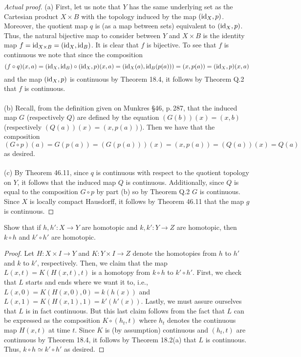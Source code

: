 \begin{proof}[Actual proof]
(a) First, let us note that $Y$ has the same underlying set as
the Cartesian product $X\times B$ with the topology induced by
the map $(\operatorname{id}_X,p)$. Moreover, the quotient map $q$ is (as a map
between sets) equivalent to $(\operatorname{id}_X,p)$. Thus, the natural
bijective map to consider between $Y$ and $X\times B$ is the
identity map $f=\operatorname{id}_{X\times B}=(\operatorname{id}_X,\operatorname{id}_B)$. It is clear that
$f$ is bijective. To see that $f$ is continuous we note that
since the composition
\[
(f\circ q)(x,a)
=(\operatorname{id}_X,\operatorname{id}_B)\circ(\operatorname{id}_X,p)(x,a)
=(\operatorname{id}_X(a),\operatorname{id}_B(p(a)))
=(x,p(a))
=(\operatorname{id}_X,p)(x,a)
\]
and the map $(\operatorname{id}_X,p)$ is continuous by Theorem 18.4, it
follows by Theorem Q.2 that $f$ is continuous.
\\\\
(b) Recall, from the definition given on Munkres \S46, p.\,287,
that the induced map $G$ (respectively $Q$) are defined by the
equation $(G(b))(x)=(x,b)$ (respectively
$(Q(a))(x)=(x,p(a))$). Then we have that the composition
\[
(G\circ p)(a)=G(p(a))=(G(p(a)))(x)=(x,p(a))=(Q(a))(x)=Q(a)
\]
as desired.
\\\\
(c) By Theorem 46.11, since $q$ is continuous with respect to the
quotient topology on $Y$, it follows that the induced map $Q$ is
continuous. Additionally, since $Q$ is equal to the composition
$G\circ p$ by part (b) so by Theorem Q.2 $G$ is continuous. Since
$X$ is locally compact Hausdorff, it follows by Theorem 46.11
that the map $g$ is continuous.
\end{proof}
\newpage
\begin{problem}[Munkres \S51, Ex.\,1]
Show that if $h,h'\colon X\to Y$ are homotopic and $k,k'\colon
Y\to Z$ are homotopic, then $k\circ h$ and $k'\circ h'$ are
homotopic.
\end{problem}
\begin{proof}
Let $H\colon X\times I\to Y$ and $K\colon Y\times I\to Z$ denote
the homotopies from $h$ to $h'$ and $k$ to $k'$,
respectively. Then, we claim that the map $L(x,t)=K(H(x,t),t)$ is
a homotopy from $k\circ h$ to $k'\circ h'$. First, we check that
$L$ starts and ends where we want it to, i.e.,
$L(x,0)=K(H(x,0),0)=k(h(x))$ and
$L(x,1)=K(H(x,1),1)=k'(h'(x))$. Lastly, we must assure ourselves
that $L$ is in fact continuous. But this last claim follows from
the fact that $L$ can be expressed as the composition $K\circ
(h_t,t)$ where $h_t$ denotes the continuous map $H(x,t)$ at time
$t$. Since $K$ is (by assumption) continuous and $(h_t,t)$ are
continuous by Theorem 18.4, it follows by Theorem 18.2(a) that
$L$ is continuous. Thus, $k\circ h\simeq k'\circ h'$ as desired.
\end{proof}
